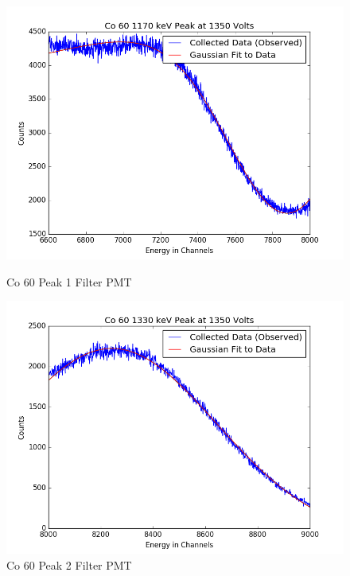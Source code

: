 \documentclass{article}
\begin{document}

\begin{figure}[H]
  \centering
  \begin{minipage}[b]{0.4\textwidth}
    \includegraphics[width=\textwidth]{FilCo1fit.png}
    \caption{Co 60 Peak 1 Filter PMT}
  \end{minipage}
  \hfill
  \begin{minipage}[b]{0.4\textwidth}
    \includegraphics[width=\textwidth]{FilCo2fit.png}
    \caption{Co 60 Peak 2 Filter PMT}
  \end{minipage}
\end{figure}
\end{document}
